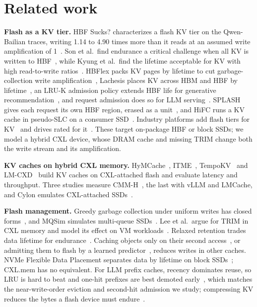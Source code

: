 \documentclass[acmsmall,screen,review]{acmart}
\begin{document}
\section{Related work}
\label{sec:related}
\textbf{Flash as a KV tier.} HBF Sucks? characterizes a flash KV tier on the Qwen-Bailian traces,
writing 1.14 to 4.90 times more than it reads at an assumed write amplification of
1~\cite{hbfsucks}. Son et al.\ find endurance a critical challenge when all KV is written to
HBF~\cite{son_hbf}, while Kyung et al.\ find the lifetime acceptable for KV with high read-to-write
ratios~\cite{kyung_hbf}. HBFlex packs KV pages by lifetime to cut garbage-collection write
amplification~\cite{hbflex}, Lachesis places KV across HBM and HBF by lifetime~\cite{lachesis}, an
LRU-K admission policy extends HBF life for generative recommendation~\cite{huawei_hbf}, and request
admission does so for LLM serving~\cite{berkeley_hbf}. SPLASH gives each request its own HBF region,
erased as a unit~\cite{splash}, and HiFC runs a KV cache in pseudo-SLC on a consumer
SSD~\cite{hifc}. Industry platforms add flash tiers for KV~\cite{nvidia_cmx,dynamo_kvbm} and drives
rated for it~\cite{scaleflux}. These target on-package HBF or block SSDs; we model a hybrid CXL
device, whose DRAM cache and missing TRIM change both the write stream and its amplification.

\textbf{KV caches on hybrid CXL memory.} HyMCache~\cite{hymcache}, ITME~\cite{itme},
TempoKV~\cite{tempokv} and LM-CXD~\cite{lmcxd} build KV caches on CXL-attached flash and evaluate
latency and throughput. Three studies measure CMM-H~\cite{cmmh,cmmh_hs,huen_cal}, the last with vLLM
and LMCache, and Cylon emulates CXL-attached SSDs~\cite{cylon}.

\textbf{Flash management.} Greedy garbage collection under uniform writes has closed
forms~\cite{desnoyers,vanhoudt}, and MQSim simulates multi-queue SSDs~\cite{mqsim}. Lee et al.\
argue for TRIM in CXL memory and model its effect on VM workloads~\cite{trimcxl}. Relaxed retention
trades data lifetime for endurance~\cite{warm}. Caching objects only on their second
access~\cite{secondhit}, or admitting them to flash by a learned
predictor~\cite{flashield,baleen}, reduces writes in other caches. NVMe Flexible Data Placement
separates data by lifetime on block SSDs~\cite{fdp_cachelib,fdp_promise}; CXL.mem has no
equivalent. For LLM prefix caches, recency dominates reuse, so LRU is hard to beat and one-hit
prefixes are best demoted early~\cite{fancy_eviction}, which matches the near-write-order eviction
and second-hit admission we study; compressing KV reduces the bytes a flash device must
endure~\cite{flash_inference}.
\end{document}
